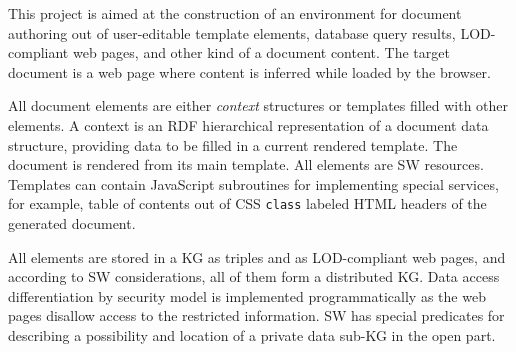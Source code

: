 \documentclass[a4paper]{jctart19a}
\begin{document}
This project \cite{authoring} is aimed at the construction of an environment for document authoring out of user-editable template elements, database query results, LOD-compliant web pages, and other kind of a document content.  The target document is a web page where content is inferred while loaded by the browser.

All document elements are either \emph{context} structures or templates filled with other elements.  A context is an RDF hierarchical representation of a document data structure, providing data to be filled in a current rendered template.  The document is rendered from its main template.  All elements are SW resources.  Templates can contain JavaScript subroutines for implementing special services, for example, table of contents out of CSS \verb|class| labeled HTML headers of the generated document.

All elements are stored in a KG as triples and as LOD-compliant web pages, and according to SW considerations, all of them form a distributed KG.  Data access differentiation by security model is implemented programmatically as the web pages disallow access to the restricted information.  SW has special predicates for describing a possibility and location of a private data sub-KG in the open part.
\end{document}
